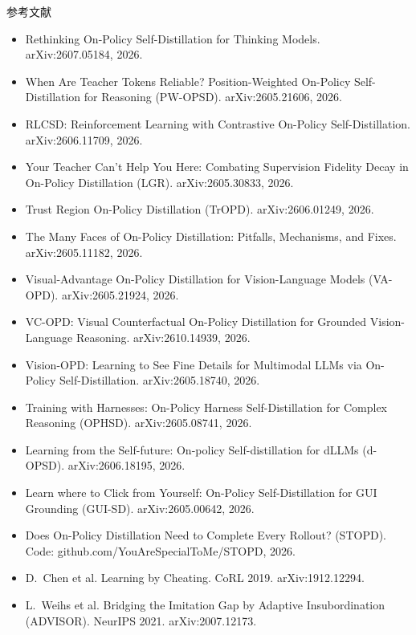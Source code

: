 \documentclass[aspectratio=169,11pt]{beamer}
\begin{document}
\begin{frame}[allowframebreaks]{参考文献}
\scriptsize
\begin{itemize}
  \setlength\itemsep{0pt}
  \item Rethinking On-Policy Self-Distillation for Thinking Models. arXiv:2607.05184, 2026.
  \item When Are Teacher Tokens Reliable? Position-Weighted On-Policy Self-Distillation for Reasoning (PW-OPSD). arXiv:2605.21606, 2026.
  \item RLCSD: Reinforcement Learning with Contrastive On-Policy Self-Distillation. arXiv:2606.11709, 2026.
  \item Your Teacher Can't Help You Here: Combating Supervision Fidelity Decay in On-Policy Distillation (LGR). arXiv:2605.30833, 2026.
  \item Trust Region On-Policy Distillation (TrOPD). arXiv:2606.01249, 2026.
  \item The Many Faces of On-Policy Distillation: Pitfalls, Mechanisms, and Fixes. arXiv:2605.11182, 2026.
  \item Visual-Advantage On-Policy Distillation for Vision-Language Models (VA-OPD). arXiv:2605.21924, 2026.
  \item VC-OPD: Visual Counterfactual On-Policy Distillation for Grounded Vision-Language Reasoning. arXiv:2610.14939, 2026.
  \item Vision-OPD: Learning to See Fine Details for Multimodal LLMs via On-Policy Self-Distillation. arXiv:2605.18740, 2026.
  \item Training with Harnesses: On-Policy Harness Self-Distillation for Complex Reasoning (OPHSD). arXiv:2605.08741, 2026.
  \item Learning from the Self-future: On-policy Self-distillation for dLLMs (d-OPSD). arXiv:2606.18195, 2026.
  \item Learn where to Click from Yourself: On-Policy Self-Distillation for GUI Grounding (GUI-SD). arXiv:2605.00642, 2026.
  \item Does On-Policy Distillation Need to Complete Every Rollout? (STOPD). Code: github.com/YouAreSpecialToMe/STOPD, 2026.
  \item D.~Chen et al. Learning by Cheating. CoRL 2019. arXiv:1912.12294.
  \item L.~Weihs et al. Bridging the Imitation Gap by Adaptive Insubordination (ADVISOR). NeurIPS 2021. arXiv:2007.12173.
\end{itemize}
\end{frame}
\end{document}
